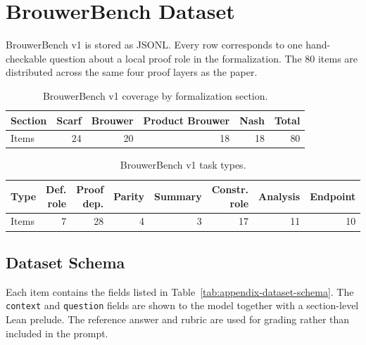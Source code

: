 \documentclass{article}
\theoremstyle{definition}
\begin{document}
\section{BrouwerBench Dataset}
\label{app:dataset}

BrouwerBench v1 is stored as JSONL. Every row corresponds to one hand-checkable question about a local proof role in the formalization. The 80 items are distributed across the same four proof layers as the paper.

\begin{table}[H]
\caption{BrouwerBench v1 coverage by formalization section.}
\label{tab:appendix-dataset-coverage}
\begin{center}
    \begin{small}
      \begin{tabular}{lrrrrr}
\toprule
Section & Scarf & Brouwer & Product Brouwer & Nash & Total \\
\midrule
Items & 24 & 20 & 18 & 18 & 80 \\
\bottomrule
\end{tabular}
    \end{small}
  \end{center}
  \vskip -0.1in
\end{table}

\begin{table}[H]
\caption{BrouwerBench v1 task types.}
\label{tab:appendix-task-types}
\begin{center}
    \begin{small}
      \begin{tabular}{lrrrrrrr}
\toprule
Type & Def. role & Proof dep. & Parity & Summary & Constr. role & Analysis & Endpoint \\
\midrule
Items & 7 & 28 & 4 & 3 & 17 & 11 & 10 \\
\bottomrule
\end{tabular}
    \end{small}
  \end{center}
  \vskip -0.1in
\end{table}

\subsection{Dataset Schema}

Each item contains the fields listed in Table~\ref{tab:appendix-dataset-schema}. The \texttt{context} and \texttt{question} fields are shown to the model together with a section-level Lean prelude. The reference answer and rubric are used for grading rather than included in the prompt.
\end{document}
